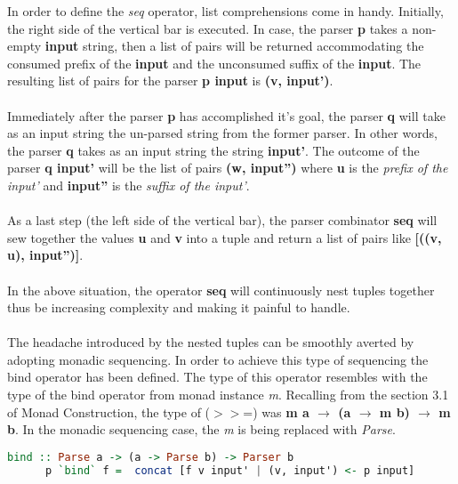 \documentclass[a4paper, onecolumn]{article}
\begin{document}
    In order to define the \textit{seq} operator, list comprehensions come in handy. Initially, the right side of the vertical bar is executed. In case, the parser \textbf{p} takes a non-empty \textbf{input} string, then a list of pairs will be returned accommodating the consumed prefix of the \textbf{input} and the unconsumed suffix of the \textbf{input}. The resulting list of pairs for the parser \textbf{p input} is \textbf{(v, input')}. \\ \\ Immediately after the parser \textbf{p} has accomplished it's goal, the parser \textbf{q} will take as an input string the un-parsed string from the former parser. In other words, the parser \textbf{q} takes as an input string the string \textbf{input'}. The outcome of the parser \textbf{q input'} will be the list of pairs \textbf{(w, input'')} where \textbf{u} is the \textit{prefix of the input'} and \textbf{input''} is the \textit{suffix of the input'}. \\ \\
    As a last step (the left side of the vertical bar), the parser combinator \textbf{seq} will sew together the values \textbf{u} and \textbf{v} into a tuple and return a list of pairs like \textbf{[((v, u), input'')]}. \\ \\
    In the above situation, the operator \textbf{seq} will continuously nest tuples together thus be increasing complexity and making it painful to handle. \\ \\
    The headache introduced by the nested tuples can be smoothly averted by adopting monadic sequencing. In order to achieve this type of sequencing the bind operator has been defined. The type of this operator resembles with the type of the bind operator from monad instance \textit{m}. Recalling from the section 3.1 of Monad Construction, the type of ($>>$=) was {\textbf{m a $\rightarrow$ (a $\rightarrow$ m b) $\rightarrow$ m b}}. In the monadic sequencing case, the \textit{m} is being replaced with \textit{Parse}.
    
    \begin{tcolorbox}
    
    \begin{lstlisting}[language=Haskell]
      bind :: Parse a -> (a -> Parse b) -> Parser b
      p `bind` f =  concat [f v input' | (v, input') <- p input]
    \end{lstlisting}
    \end{tcolorbox}
    
\end{document}
